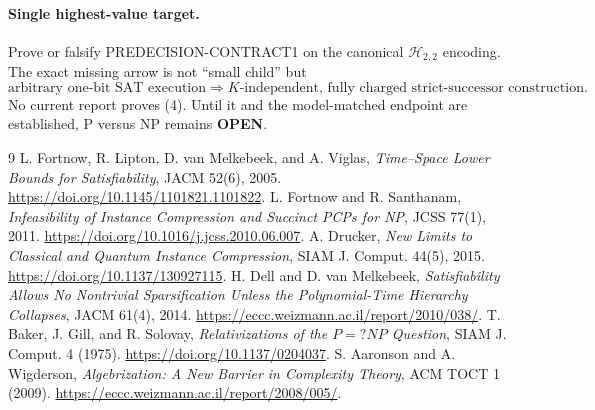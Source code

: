 \documentclass[11pt]{article}
\begin{document}
\paragraph{Single highest-value target.}
Prove or falsify PREDECISION-CONTRACT1 on the canonical
$\mathcal H_{2,2}$ encoding.  The exact missing arrow is not ``small child''
but
\[
\text{arbitrary one-bit SAT execution}
\Longrightarrow
\text{$K$-independent, fully charged strict-successor construction}.       \tag{4}
\]
No current report proves (4).  Until it and the model-matched endpoint are
established, P versus NP remains \textbf{OPEN}.

\begin{thebibliography}{9}
 L. Fortnow, R. Lipton, D. van Melkebeek, and A. Viglas,
\emph{Time--Space Lower Bounds for Satisfiability}, JACM 52(6), 2005.
\url{https://doi.org/10.1145/1101821.1101822}.
 L. Fortnow and R. Santhanam,
\emph{Infeasibility of Instance Compression and Succinct PCPs for NP},
JCSS 77(1), 2011. \url{https://doi.org/10.1016/j.jcss.2010.06.007}.
 A. Drucker,
\emph{New Limits to Classical and Quantum Instance Compression},
SIAM J. Comput. 44(5), 2015.
\url{https://doi.org/10.1137/130927115}.
 H. Dell and D. van Melkebeek,
\emph{Satisfiability Allows No Nontrivial Sparsification Unless the
Polynomial-Time Hierarchy Collapses}, JACM 61(4), 2014.
\url{https://eccc.weizmann.ac.il/report/2010/038/}.
 T. Baker, J. Gill, and R. Solovay,
\emph{Relativizations of the $P=?NP$ Question}, SIAM J. Comput. 4 (1975).
\url{https://doi.org/10.1137/0204037}.
 S. Aaronson and A. Wigderson,
\emph{Algebrization: A New Barrier in Complexity Theory}, ACM TOCT 1 (2009).
\url{https://eccc.weizmann.ac.il/report/2008/005/}.
\end{thebibliography}

\end{document}
